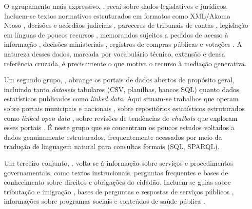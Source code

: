 O agrupamento mais expressivo, , recai sobre dados legislativos e jurídicos. Incluem-se textos normativos estruturados em formatos como XML/Akoma Ntoso \citep{Colombo2025,Colombo2024}, decisões e acórdãos judiciais \citep{Freitas_Silva_2026}, pareceres de tribunais de contas \citep{wcge}, legislação em línguas de poucos recursos \citep{Rakhimova2025}, memorandos sujeitos a pedidos de acesso à informação \citep{Baron2023}, decisões ministeriais \citep{MakingPDFsAccessible2023}, registros de compras públicas e votações \citep{ExpertMultiAgent2025} \ifhl\mbox{\colorbox{yellow}{\citep{Tsourma2025}}}\else\citep{Tsourma2025}\fi. A natureza desses dados, marcada por vocabulário técnico, extensão e densa referência cruzada, é precisamente o que motiva o recurso à mediação generativa.

Um segundo grupo, , abrange os portais de dados abertos de propósito geral, incluindo tanto \emph{datasets} tabulares (CSV, planilhas, bancos SQL) quanto dados estatísticos publicados como \emph{linked data}. Aqui situam-se trabalhos que operam sobre portais municipais e nacionais \citep{ChatbotMadrid2021,EffectiveUseOGD2025,Gan2026,TAGIFY2025,ConversationalInterfaces2024,DesigningODAssistant2024,RobotStorytelling2025,Dineva2025}, sobre repositórios estatísticos estruturados como \emph{linked open data} \citep{ScotlandChatGPT2024,EvaluatingLLMsOGD2025}, sobre revisões de tendências de \emph{chatbots} que exploram esses portais \citep{TrendsChatbots2023} \ifhl\mbox{\colorbox{yellow}{\citep{GarciaMontero2026}}}\else\citep{GarciaMontero2026}\fi. É neste grupo que se concentram os poucos estudos voltados a dados genuinamente estruturados, frequentemente acessados por meio da tradução de linguagem natural para consultas formais (SQL, SPARQL).

Um terceiro conjunto, , volta-se à informação sobre serviços e procedimentos governamentais, como textos instrucionais, perguntas frequentes e bases de conhecimento sobre direitos e obrigações do cidadão. Incluem-se guias sobre tributação e imigração \citep{HeyGoogleTaxes2025}, bases de perguntas e respostas de serviços públicos \citep{Gao2023,IntelligentPractices2025}, informações sobre programas sociais \citep{Nagesh2025} e conteúdos de saúde pública \citep{Ingole2024}\ifhl\mbox{\colorbox{yellow}{\citep{Syahidi2025}}}\else\citep{Syahidi2025}\fi{}\ifhl\mbox{\colorbox{yellow}{\citep{Kumar2024}}}\else\citep{Kumar2024}\fi{}\ifhl\mbox{\colorbox{yellow}{\citep{Fang2023}}}\else\citep{Fang2023}\fi{}\ifhl\mbox{\colorbox{yellow}{\citep{Ryu2025}}}\else\citep{Ryu2025}\fi.

